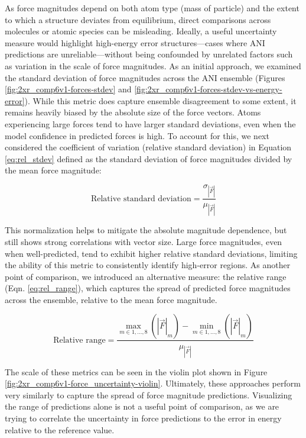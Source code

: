 As force magnitudes depend on both atom type (mass of particle) and the extent to which a structure deviates from equilibrium, direct comparisons across molecules or atomic species can be misleading. 
Ideally, a useful uncertainty measure would highlight high-energy error structures---cases where ANI predictions are unreliable---without being confounded by unrelated factors such as variation in the scale of force magnitudes.
As an initial approach, we examined the standard deviation of force magnitudes across the ANI ensemble (Figures \ref{fig:2xr_comp6v1-forces-stdev} and \ref{fig:2xr_comp6v1-forces-stdev-vs-energy-error}). 
While this metric does capture ensemble disagreement to some extent, it remains heavily biased by the absolute size of the force vectors.
Atoms experiencing large forces tend to have larger standard deviations, even when the model confidence in predicted forces is high. 
To account for this, we next considered the coefficient of variation (relative standard deviation) in Equation \ref{eq:rel_stdev} defined as the standard deviation of force magnitudes divided by the mean force magnitude:

\begin{equation} 
\text{Relative standard deviation} = \frac{\sigma_{|\vec{F}|}}{\mu_{|\vec{F}|}}
\label{eq:rel_stdev}
\end{equation}

This normalization helps to mitigate the absolute magnitude dependence, but still shows strong correlations with vector size. 
Large force magnitudes, even when well-predicted, tend to exhibit higher relative standard deviations, limiting the ability of this metric to consistently identify high-error regions.
As another point of comparison, we introduced an alternative measure: the relative range (Eqn. \ref{eq:rel_range}), which captures the spread of predicted force magnitudes across the ensemble, relative to the mean force magnitude.

\begin{equation} 
\text{Relative range} = 
\frac{\max\limits_{m \in {1, \dots, 8}}\left( |\vec{F}|_m \right) - \min\limits_{m \in {1, \dots, 8}} \left( |\vec{F}|_m \right)}
                            {\mu_{|\vec{F}|}} 
\label{eq:rel_range}
\end{equation}

The scale of these metrics can be seen in the violin plot shown in Figure \ref{fig:2xr_comp6v1-force_uncertainty-violin}.
Ultimately, these approaches perform very similarly to capture the spread of force magnitude predictions.
Visualizing the range of predictions alone is not a useful point of comparison, as we are trying to correlate the uncertainty in force predictions to the error in energy relative to the reference value.

